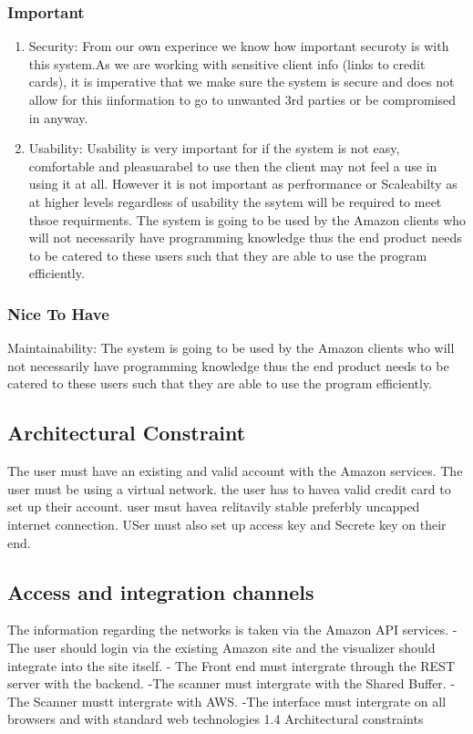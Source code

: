 \documentclass[hidelinks,a4paper,12pt]{article}
\begin{document}
		\subsubsection {Important}
\begin{enumerate}  
					\item Security: From our own experince we know how important securoty is with this system.As we are working with sensitive client info (links to credit cards), it is imperative that we make sure the system is secure and does not allow for this iinformation to go to unwanted 3rd parties or be compromised in anyway.

\item Usability: Usability is very important for if the system is not easy, comfortable and pleasuarabel to use then the client may not feel a use in using it at all. However it is not important as perfrormance or Scaleabilty as at higher levels regardless of usability the ssytem will be required to meet thsoe requirments. The system is going to be used by the Amazon clients who will not necessarily have programming knowledge thus the end product needs to be catered to these users such that they are able to use the program efficiently.
\end{enumerate}	

		\subsubsection {Nice To Have}
			Maintainability: The system is going to be used by the Amazon clients who will not necessarily have programming knowledge thus the end product needs to be catered to these users such that they are able to use the program efficiently.
	\subsection{Architectural Constraint}
	The user must have an existing and valid account with the Amazon services.
          The user must be using a virtual network. the user has to havea valid credit card to set up their account. user msut havea relitavily stable preferbly uncapped internet connection. USer must also set up access key and Secrete key on their end.
	\subsection{Access and integration channels}
 The information regarding the networks is taken via the Amazon API services.
- The user should login via the existing Amazon site and the visualizer should integrate into the site itself.
- The Front end must intergrate through the REST server with the backend. 
-The scanner must intergrate with the Shared Buffer.
-The Scanner mustt intergrate with AWS.
-The interface must intergrate on all browsers and with standard web technologies
1.4 Architectural constraints
\end{document}
